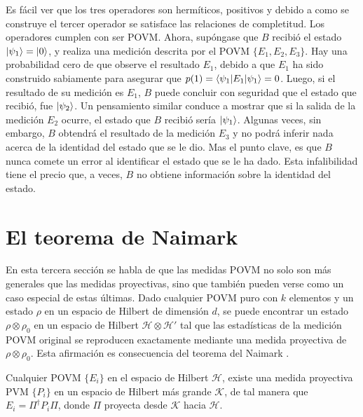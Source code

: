 Es fácil ver que los tres operadores son hermíticos, positivos y debido a como se construye el tercer operador se satisface las relaciones de completitud. Los operadores cumplen con ser POVM\@. Ahora, supóngase que $B$ recibió el estado $|\psi_1\rangle=|0\rangle$, y realiza una medición descrita por el POVM $\{E_1,E_2,E_3\}$. Hay una probabilidad cero de que observe el resultado $E_1$, debido a que $E_1$ ha sido construido sabiamente para asegurar que $p(1)=\langle\psi_1|E_1|\psi_1\rangle=0$. Luego, si el resultado de su medición es $E_1$, $B$ puede concluir con seguridad que el estado que recibió, fue $|\psi_2\rangle $. Un pensamiento similar conduce a mostrar que si la salida de la medición $E_2$ ocurre, el estado que $B$ recibió sería $|\psi_1\rangle$. Algunas veces, sin embargo, $B$ obtendrá el resultado de la medición $E_3$ y no podrá inferir nada acerca de la identidad del estado que se le dio. Mas el punto clave, es que $B$ nunca comete un error al identificar el estado que se le ha dado. Esta infalibilidad tiene el precio que, a veces, $B$ no obtiene información sobre la identidad del estado.



\section{El teorema de Naimark}

En esta tercera sección se habla de que las medidas POVM no solo son más generales que las medidas proyectivas, sino que también pueden verse como un caso especial de estas últimas. Dado cualquier POVM puro con $k$ elementos y un estado $\rho$ en un espacio de Hilbert de dimensión $d$, se puede encontrar un estado $\rho \otimes \rho_0$ en un espacio de Hilbert  $\mathcal{H}\otimes\mathcal{H'}$ tal que las estadísticas de la medición POVM original se reproducen exactamente mediante una medida proyectiva de $\rho \otimes \rho_0$. Esta afirmación es consecuencia del teorema del Naimark {\cite{2007geometry}}.




\begin{theorem} Cualquier POVM $\{E_i\}$ en el espacio de Hilbert $\mathcal{H}$, existe una medida proyectiva PVM $\{P_i\}$ en un espacio de Hilbert más grande $\mathcal{K}$, de tal manera que $E_i=\Pi^\dagger P_i\Pi$, donde $\Pi$ proyecta desde $\mathcal{K}$ hacia $\mathcal{H}$.
\end{theorem}
	

